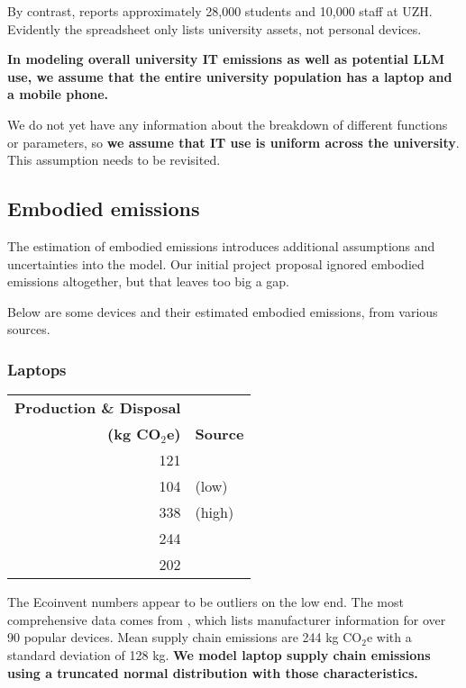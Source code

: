 \documentclass[11pt]{article}
\newcommand{\assumption}[1]{{\bf #1}}
\begin{document}
By contrast, \textcite{wikiuzh} reports approximately 28,000 students and 10,000 staff
at UZH. Evidently the spreadsheet only lists university assets, not personal devices.

\assumption{In modeling overall university IT emissions as well as potential LLM use,
we assume that the entire university population has a laptop and a mobile phone.}

We do not yet have any information about the breakdown of different functions or parameters, so
\assumption{we assume that IT use is uniform across the university}. This assumption needs to be
revisited.

\subsection{Embodied emissions}
The estimation of embodied emissions introduces additional assumptions and uncertainties into
the model. Our initial project proposal ignored embodied emissions altogether, but that leaves
too big a gap.

Below are some devices and their estimated embodied emissions, from various sources.

\subsubsection{Laptops}

\begin{center}
\begin{tabular}{|r|l|}
\hline
\textbf{Production \& Disposal} & \\
\textbf{(kg CO$_2$e)} & \textbf{Source} \\ \hline
121 & \textcite{ecoinvent}  \\ \hline
104 & \textcite{teehan2013} (low) \\ \hline
338 & \textcite{teehan2013} (high) \\ \hline
244 & \textcite{rarecoil} \\ \hline
202 & \textcite{unctadder2024} \\ \hline
\end{tabular}
\label{tab:embodied_emissions:laptops}
\end{center}

The Ecoinvent numbers appear to be outliers on the low end.
The most comprehensive data comes from \textcite{rarecoil}, which lists manufacturer
information for over 90 popular devices. Mean supply chain emissions are
244 kg CO$_2$e with a standard deviation of 128 kg.
\assumption{We model laptop supply chain emissions using a truncated normal distribution with those characteristics.}
\end{document}
